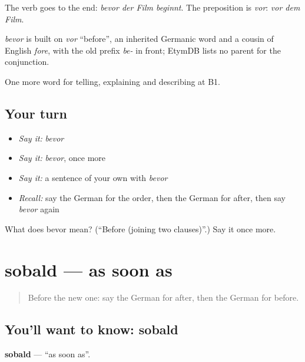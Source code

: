 The verb goes to the end: \emph{bevor der Film beginnt}. The preposition is \emph{vor}: \emph{vor dem Film}.

\begin{cousinweb}
\emph{bevor} is built on \emph{vor} \textquotedblleft{}before\textquotedblright{}, an inherited Germanic word and a cousin of English \emph{fore}, with the old prefix \emph{be-} in front; EtymDB lists no parent for the conjunction.
\end{cousinweb}

\begin{grammarlens}[title={What you've built}]
One more word for telling, explaining and describing at B1.
\end{grammarlens}

\subsection*{Your turn}
\begin{itemize}
\raggedright
  \item \emph{Say it:} \emph{bevor}
  \item \emph{Say it:} \emph{bevor}, once more
  \item \emph{Say it:} a sentence of your own with \emph{bevor}
  \item \emph{Recall:} say the German for the order, then the German for after, then say \emph{bevor} again
\end{itemize}

\begin{tcolorbox}[breakable,colback=teal!4,colframe=teal!35!black,title={Before you move on}]
What does bevor mean? (\textquotedblleft{}Before (joining two clauses)\textquotedblright{}.) Say it once more.
\end{tcolorbox}
\section[sobald]{sobald — as soon as}

\label{lesson:GE-C263-sobald}



\begin{quote}
Before the new one: say the German for after, then the German for before.
\end{quote}

\subsection*{You'll want to know: sobald}
\textbf{sobald} — \textquotedblleft{}as soon as\textquotedblright{}.

